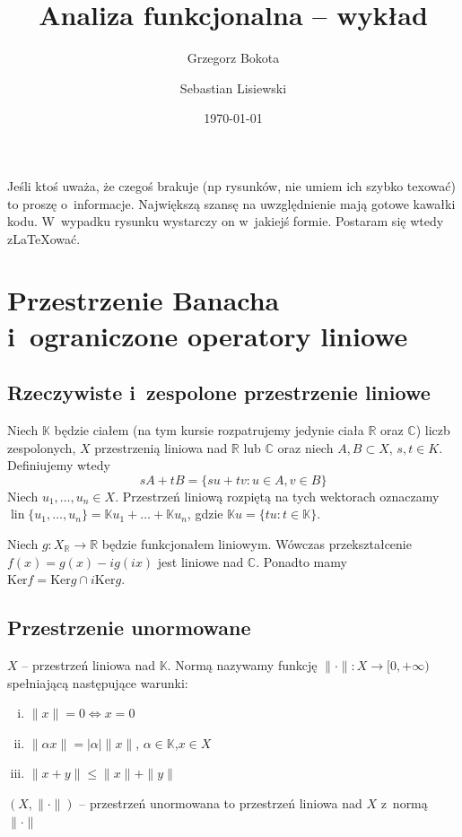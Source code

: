 \documentclass[11pt]{mwrep}
\title{Analiza funkcjonalna  -- wykład}
\author{Grzegorz Bokota \and \normalsize  Sebastian Lisiewski}%
\date{\today}
\renewcommand{\[}{\begin{equation}}
\renewcommand{\]}{\end{equation}}
\newcommand{\C}{{\ensuremath{\mathbb C}}}
\newcommand{\R}{{\ensuremath{\mathbb R}}}
\newcommand{\K}{\ensuremath{\mathbb{K}}}
\newcommand{\lin}{\operatorname{lin}}
\newcounter{numer}
\begin{document}
\setlength{\headheight}{15pt}
\pagestyle{fancy}
\maketitle
\tableofcontents
{}
Jeśli ktoś uważa, że czegoś brakuje (np rysunków, nie umiem ich szybko texować) to proszę o~informacje. 
Największą szansę na uwzględnienie mają gotowe kawałki kodu. W~wypadku rysunku wystarczy on w~jakiejś formie. Postaram się wtedy z\LaTeX ować.
\chapter{Przestrzenie Banacha i~ograniczone operatory liniowe}
\section{Rzeczywiste i~zespolone przestrzenie liniowe}
Niech $\K$ będzie ciałem (na tym kursie rozpatrujemy jedynie ciała $\R$ oraz $\C$) liczb zespolonych,
$X$ przestrzenią liniowa nad $\R$ lub $\C$ oraz niech $A,B \subset  X$, $s,t \in K$. Definiujemy wtedy
$$sA+tB = \{su + tv\colon u \in A, v\in B\}$$
Niech $u_1,\ldots ,u_n \in X $. Przestrzeń liniową rozpiętą na tych wektorach oznaczamy $\lin\{u_1,\ldots, u_n\} = \K u_1 + \ldots + \K u_n $, gdzie $\K u = \{ t u\colon t \in \K\}$. 

Niech $g: X_\R \to \R $ będzie funkcjonałem liniowym. Wówczas przekształcenie $f(x) =g(x) - ig(ix)$ jest liniowe nad $\C$. Ponadto mamy $\textrm{Ker}f = \textrm{Ker} g \cap i \textrm{Ker}g$.

\section{Przestrzenie unormowane}
$X$ -- przestrzeń liniowa nad $\K$. Normą nazywamy funkcję  $\|\cdot \|\colon X \to [0, +\infty )$ spełniającą następujące warunki:
	\begin{enumerate}[i.]
	\item $\|x\| = 0 \Leftrightarrow x=0$ 
	\item $\|\alpha x \| = |\alpha| \| x\|$, $\alpha \in \K$,$x\in X$ 
	\item $\|x+y\| \le \|x\| + \|y\|$  
\end{enumerate}
$(X,\|\cdot\|)$ -- przestrzeń unormowana to przestrzeń liniowa nad $X$ z~normą $\|\cdot\|$\\
\end{document}
